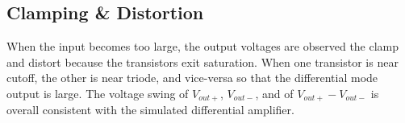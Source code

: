 \subsection{Clamping \& Distortion}
When the input becomes too large, the output voltages are observed the clamp and distort because the transistors exit saturation.
When one transistor is near cutoff, the other is near triode, and vice-versa so that the differential mode output is large.
The voltage swing of $V_{out+}$, $V_{out-}$, and of $V_{out+} - V_{out-}$ is overall consistent with the simulated differential amplifier.
